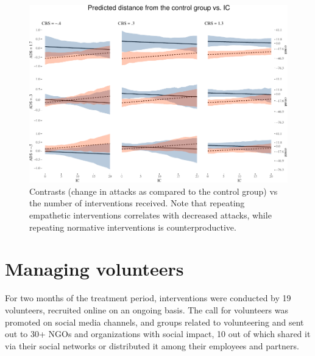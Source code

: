 \documentclass[preprint,12pt]{elsarticle}
\begin{document}
\begin{figure}

\begin{center}\includegraphics[width=1\linewidth]{ figures/visICPlot-1} \end{center}
\caption{Contrasts (change in attacks as compared to the control group) vs the number
of interventions received. Note that repeating empathetic interventions
correlates with decreased attacks, while repeating normative interventions
is counterproductive.}
\label{fig:ContrastsIC}
\end{figure}














\section{Managing volunteers}\label{volunteers}

For two months of the treatment period, interventions were conducted by 19 volunteers, recruited  online on an ongoing basis. The call for volunteers was promoted on social media channels, and groups related to volunteering and sent out to 30+ NGOs and organizations with social impact, 10 out of which shared it via their social networks or distributed it among their employees and partners. 
\end{document}
